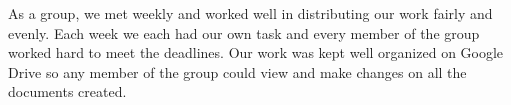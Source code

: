 As a group, we met weekly and worked well in distributing our work fairly and
evenly. Each week we each had our own task and every member of the group worked
hard to meet the deadlines. Our work was kept well organized on Google Drive so
any member of the group could view and make changes on all the documents
created.
